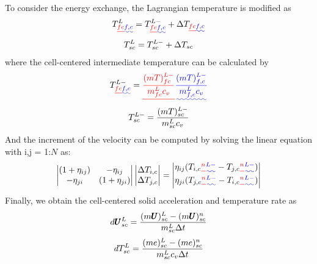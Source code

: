 \documentclass[preprint,12pt]{elsarticle}
\providecommand{\DIFadd}[1]{{\protect\color{blue}\uwave{#1}}} %
\providecommand{\DIFdel}[1]{{\protect\color{red}\sout{#1}}}                      %
\providecommand{\DIFaddbegin}{} %
\providecommand{\DIFaddend}{} %
\providecommand{\DIFdelbegin}{} %
\providecommand{\DIFdelend}{} %
\newcommand{\DIFscaledelfig}{0.5}
\newlength{\DIFdelgraphicswidth} %
\newlength{\DIFdelgraphicsheight} %
\newcommand{\DIFaddincludegraphics}[2][]{{\color{blue}\fbox{\DIFOincludegraphics[#1]{#2}}}} %
\newcommand{\DIFdelincludegraphics}[2][]{%
\sbox{\DIFdelgraphicsbox}{\DIFOincludegraphics[#1]{#2}}%
\settoboxwidth{\DIFdelgraphicswidth}{\DIFdelgraphicsbox} %
\settoboxtotalheight{\DIFdelgraphicsheight}{\DIFdelgraphicsbox} %
\scalebox{\DIFscaledelfig}{%
\parbox[b]{\DIFdelgraphicswidth}{\usebox{\DIFdelgraphicsbox}\\[-\baselineskip] \rule{\DIFdelgraphicswidth}{0em}}\llap{\resizebox{\DIFdelgraphicswidth}{\DIFdelgraphicsheight}{%
\setlength{\unitlength}{\DIFdelgraphicswidth}%
\begin{picture}(1,1)%
\thicklines\linethickness{2pt} %
{\color[rgb]{1,0,0}\put(0,0){\framebox(1,1){}}}%
{\color[rgb]{1,0,0}\put(0,0){\line( 1,1){1}}}%
{\color[rgb]{1,0,0}\put(0,1){\line(1,-1){1}}}%
\end{picture}%
}\hspace*{3pt}}} %
} %
\DeclareRobustCommand{\DIFaddbegin}{\DIFOaddbegin \let\includegraphics\DIFaddincludegraphics} %
\DeclareRobustCommand{\DIFaddend}{\DIFOaddend \let\includegraphics\DIFOincludegraphics} %
\DeclareRobustCommand{\DIFdelbegin}{\DIFOdelbegin \let\includegraphics\DIFdelincludegraphics} %
\DeclareRobustCommand{\DIFdelend}{\DIFOaddend \let\includegraphics\DIFOincludegraphics} %
\begin{document}
%
%
To consider the energy exchange, the Lagrangian temperature  is modified as\DIFaddbegin \DIFadd{:
}\DIFaddend %
\begin{equation}
\begin{gathered}
T_{\DIFdelbegin \DIFdel{fc}\DIFdelend \DIFaddbegin \DIFadd{f,c}\DIFaddend }^{L} = T_{\DIFdelbegin \DIFdel{fc}\DIFdelend \DIFaddbegin \DIFadd{f,c}\DIFaddend }^{L-} + \Delta T_{\DIFdelbegin \DIFdel{fc}\DIFdelend \DIFaddbegin \DIFadd{f,c}\DIFaddend } \\
T_{sc}^{L} = T_{sc}^{L-} + \Delta T_{sc}
\end {gathered}
\end {equation}
%
%
where the cell-centered intermediate temperature can be calculated by\DIFaddbegin \DIFadd{:
}\DIFaddend %
\begin{equation}
\begin{gathered}
T_{\DIFdelbegin \DIFdel{fc}\DIFdelend \DIFaddbegin \DIFadd{f,c}\DIFaddend }^{L-} = \DIFdelbegin \DIFdel{\frac{(m T)_{fc}^{L-}}{m_{fc}^L c_v} }\DIFdelend \DIFaddbegin \DIFadd{\frac{(m T)_{f,c}^{L-}}{m_{f,c}^L c_v} }\DIFaddend \\
T_{sc}^{L-} = \frac{(m T)_{sc}^{L-}}{m_{sc}^L c_v} 
\end {gathered}
\end {equation}
%
%
And the increment of the velocity can be computed by solving the linear equation with i,j = 1:$N$ as:
%
%
\[ \begin{vmatrix} (1 + \eta_{ij})  &  -\eta_{ij} \\
                  -\eta_{ji}       &  (1 + \eta_{ji})
    \end {vmatrix}
    \begin{vmatrix} \Delta T_{i,c} \\
                    \Delta T_{j,c}
    \end {vmatrix}
    =
    \begin{vmatrix}  \eta_{ij}(T_{i,c}\DIFdelbegin \DIFdel{^{n} }\DIFdelend \DIFaddbegin \DIFadd{^{L-} }\DIFaddend - T_{j,c}\DIFdelbegin \DIFdel{^{n}}\DIFdelend \DIFaddbegin \DIFadd{^{L-}}\DIFaddend ) \\
                    \eta_{ji}(T_{j,c}\DIFdelbegin \DIFdel{^{n} }\DIFdelend \DIFaddbegin \DIFadd{^{L-} }\DIFaddend - T_{i,c}\DIFdelbegin \DIFdel{^{n}}\DIFdelend \DIFaddbegin \DIFadd{^{L-}}\DIFaddend )
    \end {vmatrix}                
\]
%
%
Finally, we obtain the cell-centered solid  acceleration and temperature rate as\DIFaddbegin \DIFadd{:
}\DIFaddend %
%
\begin{equation}
 d\pmb{U}_{sc}^L = \frac{(m \pmb{U})_{sc}^L - (m \pmb{U})_{sc}^n}{m_{sc}^L \Delta{t}}
\end {equation}
%
\begin{equation}
 dT_{sc}^L = \frac{(me)_{sc}^L - (me)_{sc}^n}{m_{sc}^L c_v \Delta{t}}
\end {equation}
%
%
\end{document}
